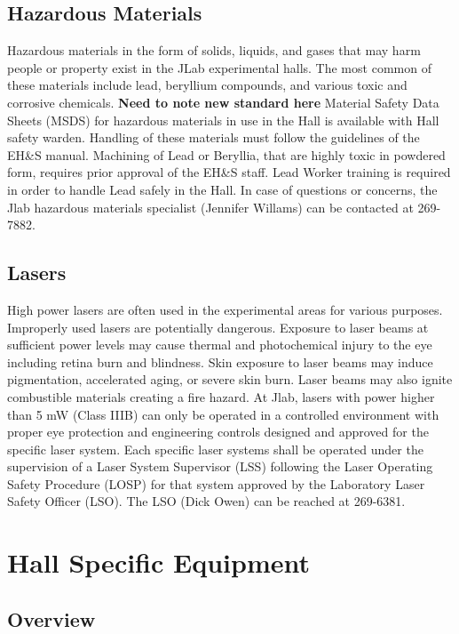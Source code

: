 \section{Hazardous Materials}

	Hazardous materials in the form of solids, liquids, and gases that may harm people 
or property exist in the JLab experimental halls. The most common of these materials include 
lead, beryllium compounds, and various toxic and corrosive chemicals. 
{\bf{Need to note new standard here}} Material Safety Data Sheets (MSDS) for hazardous materials 
in use in the Hall is available with Hall safety warden.  Handling of these materials 
must follow the guidelines of the EH\&S manual. Machining of Lead or Beryllia, that 
are highly toxic in powdered form, requires prior approval of the EH\&S staff. 
Lead Worker training is required in order to handle Lead safely in the Hall. 
In case of questions or concerns, the Jlab hazardous materials specialist (Jennifer Willams) can be contacted at 269-7882.

\section{Lasers}

	High power lasers are often used in the experimental areas for various purposes. Improperly 
used lasers are potentially dangerous. Exposure to laser beams at sufficient power levels 
may cause thermal and photochemical injury to the eye including retina burn and blindness. 
Skin exposure to laser beams may induce pigmentation, accelerated aging, or severe skin burn. 
Laser beams may also ignite combustible materials creating a fire hazard. At Jlab, lasers with power 
higher than 5 mW (Class IIIB) can only be operated in a controlled environment with proper eye protection 
and engineering controls designed and approved for the specific laser system. Each specific laser systems 
shall be operated under the supervision of a Laser System Supervisor (LSS) following the Laser 
Operating Safety Procedure (LOSP) for that system approved by the Laboratory Laser Safety Officer (LSO). 
The LSO (Dick Owen) can be reached at 269-6381.

%
%
\chapter{Hall Specific Equipment}

\section{Overview}

